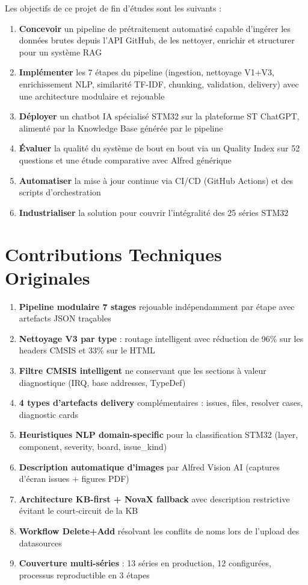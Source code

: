 \documentclass[12pt,a4paper]{report}
\begin{document}
Les objectifs de ce projet de fin d'études sont les suivants :

\begin{enumerate}
  \item \textbf{Concevoir} un pipeline de prétraitement automatisé capable d'ingérer les données brutes depuis l'API GitHub, de les nettoyer, enrichir et structurer pour un système RAG
  \item \textbf{Implémenter} les 7 étapes du pipeline (ingestion, nettoyage V1+V3, enrichissement NLP, similarité TF-IDF, chunking, validation, delivery) avec une architecture modulaire et rejouable
  \item \textbf{Déployer} un chatbot IA spécialisé STM32 sur la plateforme ST ChatGPT, alimenté par la Knowledge Base générée par le pipeline
  \item \textbf{Évaluer} la qualité du système de bout en bout via un Quality Index sur 52 questions et une étude comparative avec Alfred générique
  \item \textbf{Automatiser} la mise à jour continue via CI/CD (GitHub Actions) et des scripts d'orchestration
  \item \textbf{Industrialiser} la solution pour couvrir l'intégralité des 25 séries STM32
\end{enumerate}

\section{Contributions Techniques Originales}
\label{sec:contributions}

\begin{enumerate}
  \item \textbf{Pipeline modulaire 7 stages} rejouable indépendamment par étape avec artefacts JSON traçables
  \item \textbf{Nettoyage V3 par type} : routage intelligent avec réduction de 96\% sur les headers CMSIS et 33\% sur le HTML
  \item \textbf{Filtre CMSIS intelligent} ne conservant que les sections à valeur diagnostique (IRQ, base addresses, TypeDef)
  \item \textbf{4 types d'artefacts delivery} complémentaires : issues, files, resolver cases, diagnostic cards
  \item \textbf{Heuristiques NLP domain-specific} pour la classification STM32 (layer, component, severity, board, issue\_kind)
  \item \textbf{Description automatique d'images} par Alfred Vision AI (captures d'écran issues + figures PDF)
  \item \textbf{Architecture KB-first + NovaX fallback} avec description restrictive évitant le court-circuit de la KB
  \item \textbf{Workflow Delete+Add} résolvant les conflits de noms lors de l'upload des datasources
  \item \textbf{Couverture multi-séries} : 13 séries en production, 12 configurées, processus reproductible en 3 étapes
\end{enumerate}
\end{document}
